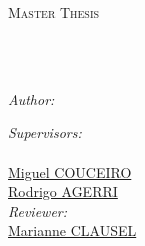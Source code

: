 \documentclass[
11pt, %
english, %
singlespacing, %
headsepline, %
]{Control/UL_control/UL_utils/MasterDoctoralThesis} %
\author{Luis Antonio \textsc{VASQUEZ REINA}} %
\begin{document}
\frontmatter %

\pagestyle{plain} %






\begin{titlepage}
\begin{center}

{\scshape\LARGE \univname\par}\vspace{1.5cm} %
\textsc{\Large Master Thesis}\\[0.5cm] %

\HRule \\[0.4cm] %
{\Huge \bfseries \ttitle\par}\vspace{0.4cm} %
\HRule \\[1.0cm] %
 
\begin{minipage}[t]{0.5\textwidth}
\begin{flushleft} \large
\emph{Author:}\\
\href{
https://github.com/LuisAVasquez
}{\authorname} %
\end{flushleft}
\end{minipage}
\begin{minipage}[t]{0.4\textwidth}
\begin{flushright} \large
\emph{Supervisors:} \\
\href{https://maiage.inrae.fr/fr/robert-bossy}{\supname}\\ %
\href{https://members.loria.fr/mcouceiro/}{Miguel COUCEIRO}\\
\href{https://ragerri.github.io/}{Rodrigo AGERRI}\\
\emph{Reviewer:}\\
\href{https://sites.google.com/site/marianneclausel/}{Marianne CLAUSEL}


\end{flushright}
\end{minipage}
\end{center}
\end{titlepage}
\end{document}
